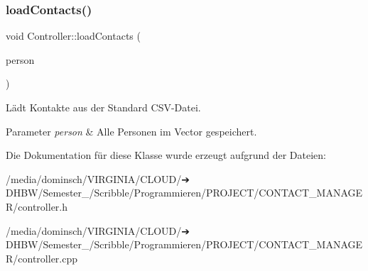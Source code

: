 \subsubsection{\texorpdfstring{load\+Contacts()}{loadContacts()}}
{\footnotesize\ttfamily void Controller\+::load\+Contacts (\begin{DoxyParamCaption}\item[{vector$<$ \hyperlink{classContactManager_1_1Person}{Person} $>$ \&}]{person }\end{DoxyParamCaption})}



Lädt Kontakte aus der Standard C\+S\+V-\/\+Datei.


\begin{DoxyParams}{Parameter}
{\em person} & Alle Personen im Vector gespeichert.\\
\hline
\end{DoxyParams}


Die Dokumentation für diese Klasse wurde erzeugt aufgrund der Dateien\+:\begin{DoxyCompactItemize}
\item 
/media/dominsch/\+V\+I\+R\+G\+I\+N\+I\+A/\+C\+L\+O\+U\+D/➔ D\+H\+B\+W/\+Semester\+\_/\+Scribble/\+Programmieren/\+P\+R\+O\+J\+E\+C\+T/\+C\+O\+N\+T\+A\+C\+T\+\_\+\+M\+A\+N\+A\+G\+E\+R/controller.\+h\item 
/media/dominsch/\+V\+I\+R\+G\+I\+N\+I\+A/\+C\+L\+O\+U\+D/➔ D\+H\+B\+W/\+Semester\+\_/\+Scribble/\+Programmieren/\+P\+R\+O\+J\+E\+C\+T/\+C\+O\+N\+T\+A\+C\+T\+\_\+\+M\+A\+N\+A\+G\+E\+R/controller.\+cpp\end{DoxyCompactItemize}
